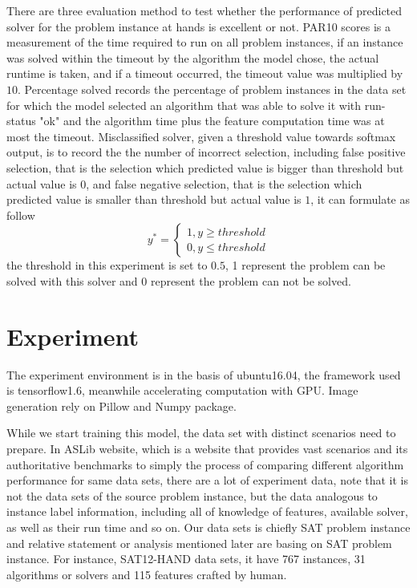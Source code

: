 \documentclass{article}
\begin{document}
    There are three evaluation method to test whether the performance of predicted solver for the problem instance at hands is excellent or not. PAR10 scores is a measurement of the time required to run on all problem instances, if an instance was solved within the timeout by the algorithm the model chose, the actual runtime is taken, and if a timeout occurred, the timeout value was multiplied by $10$. Percentage solved records the percentage of problem instances in the data set for which the model selected an algorithm that was able to solve it with run-status "ok" and the algorithm time plus the feature computation time was at most the timeout. Misclassified solver, given a threshold value towards softmax output, is to record the the number of incorrect selection, including false positive selection, that is the selection which predicted value is bigger than threshold but actual value is $0$, and false negative selection, that is the selection which predicted value is smaller than threshold but actual value is $1$, it can formulate as follow
    \begin{equation}\label{fml:misclassified-solver}
    y^* = \left\{ \begin{array}{rcl}
    1 ,  y \geq threshold \\
    0 ,  y \le threshold
    \end{array}\right.
    \end{equation}
    the threshold in this experiment is set to $0.5$, 1 represent the problem can be solved with this solver and 0 represent the problem can not be solved.

\section{Experiment}
    The experiment environment is in the basis of ubuntu16.04, the framework used is tensorflow1.6, meanwhile accelerating computation with GPU. Image generation rely on Pillow and Numpy package.

    While we start training this model, the data set with distinct scenarios need to prepare. In ASLib\cite{bischl2016aslib} website, which is a website that provides vast scenarios and its authoritative benchmarks to simply the process of comparing different algorithm performance for same data sets, there are a lot of experiment data, note that it is not the data sets of the source problem instance, but the data analogous to instance label information, including all of knowledge of features, available solver, as well as their run time and so on. Our data sets is chiefly SAT problem instance and relative statement or analysis mentioned later are basing on SAT problem instance. For instance, SAT12-HAND data sets, it have 767 instances, 31 algorithms or solvers and 115 features crafted by human.
\end{document}
